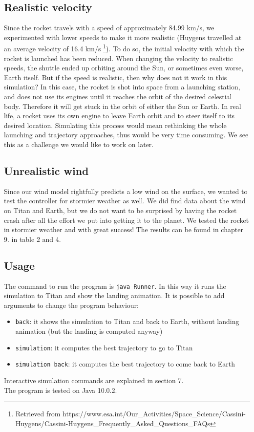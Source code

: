 \documentclass[10pt,a4paper]{article}
\begin{document}
	\subsection{Realistic velocity}
	Since the rocket travels with a speed of approximately 84.99 km/s, we experimented with lower speeds to make it more realistic (Huygens travelled at an average velocity of 16.4 km/s \footnote{Retrieved from https://www.esa.int/Our\_Activities/Space\_Science/Cassini-Huygens/Cassini-Huygens\_Frequently\_Asked\_Questions\_FAQs}). To do so, the initial velocity with which the rocket is launched has been reduced. When changing the velocity to realistic speeds, the shuttle ended up orbiting around the Sun, or sometimes even worse, Earth itself. But if the speed is realistic, then why does not it work in this simulation? In this case, the rocket is shot into space from a launching station, and does not use its engines until it reaches the orbit of the desired celestial body. Therefore it will get stuck in the orbit of either the Sun or Earth. In real life, a rocket uses its own engine to leave Earth orbit and to steer itself to its desired location. Simulating this process would mean rethinking the whole launching and trajectory approaches, thus would be very time consuming. We see this as a challenge we would like to work on later.
	
	\subsection{Unrealistic wind}
	Since our wind model rightfully predicts a low wind on the surface, we wanted to test the controller for stormier weather as well. We did find data about the wind on Titan and Earth, but we do not want to be surprised by having the rocket crash after all the effort we put into getting it to the planet. We tested the rocket in stormier weather and with great success! The results can be found in chapter 9. in table 2 and 4.
	
	
	\subsection{Usage}    
	The command to run the program is \verb|java Runner|. In this way it runs the simulation to Titan and show the landing animation. It is possible to add arguments to change the program behaviour:
	\begin{itemize}
		\item \verb|back|: it shows the simulation to Titan and back to Earth, without landing animation (but the landing is computed anyway)
		\item \verb|simulation|: it computes the best trajectory to go to Titan
		\item \verb|simulation back|: it computes the best trajectory to come back to Earth
	\end{itemize}
	Interactive simulation commands are explained in section 7.\\
	The program is tested on Java 10.0.2.
	
\end{document}
